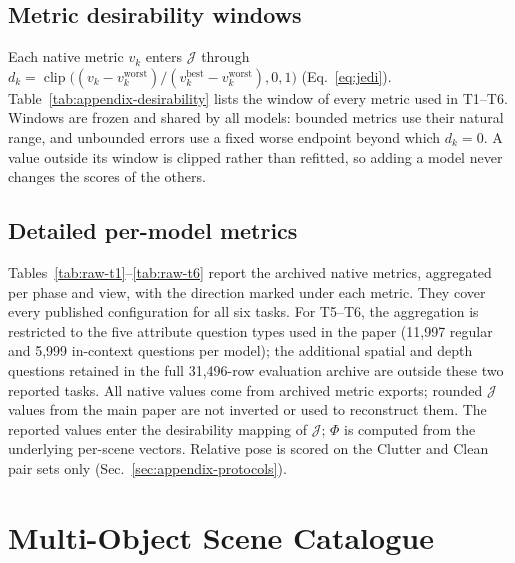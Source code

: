 

\subsection{Metric desirability windows}
\label{sec:appendix-desirability}

Each native metric $v_k$ enters $\mathcal J$ through $d_k=\operatorname{clip}\bigl((v_k-v_k^{\mathrm{worst}})/(v_k^{\mathrm{best}}-v_k^{\mathrm{worst}}),0,1\bigr)$ (Eq.~\eqref{eq:jedi}). Table~\ref{tab:appendix-desirability} lists the window of every metric used in T1--T6. Windows are frozen and shared by all models: bounded metrics use their natural range, and unbounded errors use a fixed worse endpoint beyond which $d_k=0$. A value outside its window is clipped rather than refitted, so adding a model never changes the scores of the others.



\subsection{Detailed per-model metrics}
\label{sec:appendix-raw-metrics}

Tables~\ref{tab:raw-t1}--\ref{tab:raw-t6} report the archived native metrics, aggregated per phase and view, with the direction marked under each metric. They cover every published configuration for all six tasks. For T5--T6, the aggregation is restricted to the five attribute question types used in the paper (11,997 regular and 5,999 in-context questions per model); the additional spatial and depth questions retained in the full 31,496-row evaluation archive are outside these two reported tasks. All native values come from archived metric exports; rounded $\mathcal J$ values from the main paper are not inverted or used to reconstruct them. The reported values enter the desirability mapping of $\mathcal J$; $\Phi$ is computed from the underlying per-scene vectors. Relative pose is scored on the Clutter and Clean pair sets only (Sec.~\ref{sec:appendix-protocols}).








\section{Multi-Object Scene Catalogue}
\label{sec:appendix-representative-scenes}

